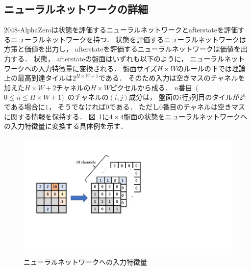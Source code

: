 \subsection{ニューラルネットワークの詳細}
\label{subsec:nn_impl}
2048-AlphaZeroは状態を評価するニューラルネットワークとafterstateを評価するニューラルネットワークを持つ．
状態を評価するニューラルネットワークは方策と価値を出力し， afterstateを評価するニューラルネットワークは価値を出力する．
状態， afterstateの盤面はいずれも以下のように， ニューラルネットワークへの入力特徴量に変換される．
盤面サイズ$H \times W$のルールの下では理論上の最高到達タイルは$2^{H \times W + 1}$である．
そのため入力は空きマスのチャネルを加えた$H \times W + 2$チャネルの$H \times W$ピクセルから成る．
$n$番目~($0 \leq n \leq H \times W + 1$)~のチャネルの$(i,j)$成分は， 盤面の$i$行$j$列目のタイルが$2^n$である場合に$1$， そうでなければ$0$である．
ただし$0$番目のチャネルは空きマスに関する情報を保持する．
図~\ref{fig:input_encoding}に$4\times4$盤面の状態をニューラルネットワークへの入力特徴量に変換する具体例を示す．
\begin{figure}[t]
    \centering
    \includegraphics[width=0.6\linewidth{}]{figures/encoding.pdf}
    \caption{ニューラルネットワークへの入力特徴量}
    \label{fig:input_encoding}
\end{figure}

